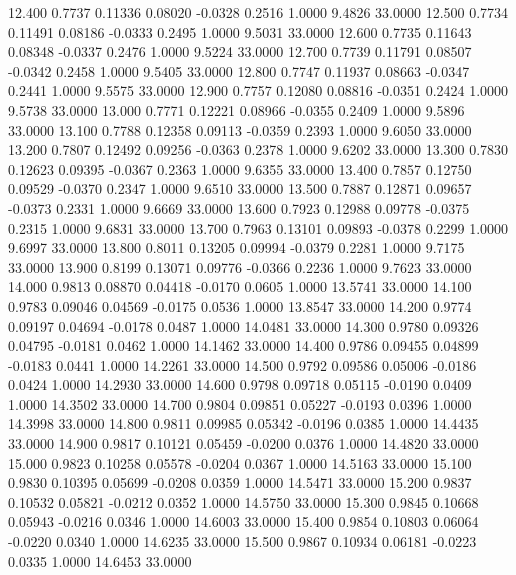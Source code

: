   12.400   0.7737   0.11336   0.08020  -0.0328   0.2516   1.0000   9.4826  33.0000
  12.500   0.7734   0.11491   0.08186  -0.0333   0.2495   1.0000   9.5031  33.0000
  12.600   0.7735   0.11643   0.08348  -0.0337   0.2476   1.0000   9.5224  33.0000
  12.700   0.7739   0.11791   0.08507  -0.0342   0.2458   1.0000   9.5405  33.0000
  12.800   0.7747   0.11937   0.08663  -0.0347   0.2441   1.0000   9.5575  33.0000
  12.900   0.7757   0.12080   0.08816  -0.0351   0.2424   1.0000   9.5738  33.0000
  13.000   0.7771   0.12221   0.08966  -0.0355   0.2409   1.0000   9.5896  33.0000
  13.100   0.7788   0.12358   0.09113  -0.0359   0.2393   1.0000   9.6050  33.0000
  13.200   0.7807   0.12492   0.09256  -0.0363   0.2378   1.0000   9.6202  33.0000
  13.300   0.7830   0.12623   0.09395  -0.0367   0.2363   1.0000   9.6355  33.0000
  13.400   0.7857   0.12750   0.09529  -0.0370   0.2347   1.0000   9.6510  33.0000
  13.500   0.7887   0.12871   0.09657  -0.0373   0.2331   1.0000   9.6669  33.0000
  13.600   0.7923   0.12988   0.09778  -0.0375   0.2315   1.0000   9.6831  33.0000
  13.700   0.7963   0.13101   0.09893  -0.0378   0.2299   1.0000   9.6997  33.0000
  13.800   0.8011   0.13205   0.09994  -0.0379   0.2281   1.0000   9.7175  33.0000
  13.900   0.8199   0.13071   0.09776  -0.0366   0.2236   1.0000   9.7623  33.0000
  14.000   0.9813   0.08870   0.04418  -0.0170   0.0605   1.0000  13.5741  33.0000
  14.100   0.9783   0.09046   0.04569  -0.0175   0.0536   1.0000  13.8547  33.0000
  14.200   0.9774   0.09197   0.04694  -0.0178   0.0487   1.0000  14.0481  33.0000
  14.300   0.9780   0.09326   0.04795  -0.0181   0.0462   1.0000  14.1462  33.0000
  14.400   0.9786   0.09455   0.04899  -0.0183   0.0441   1.0000  14.2261  33.0000
  14.500   0.9792   0.09586   0.05006  -0.0186   0.0424   1.0000  14.2930  33.0000
  14.600   0.9798   0.09718   0.05115  -0.0190   0.0409   1.0000  14.3502  33.0000
  14.700   0.9804   0.09851   0.05227  -0.0193   0.0396   1.0000  14.3998  33.0000
  14.800   0.9811   0.09985   0.05342  -0.0196   0.0385   1.0000  14.4435  33.0000
  14.900   0.9817   0.10121   0.05459  -0.0200   0.0376   1.0000  14.4820  33.0000
  15.000   0.9823   0.10258   0.05578  -0.0204   0.0367   1.0000  14.5163  33.0000
  15.100   0.9830   0.10395   0.05699  -0.0208   0.0359   1.0000  14.5471  33.0000
  15.200   0.9837   0.10532   0.05821  -0.0212   0.0352   1.0000  14.5750  33.0000
  15.300   0.9845   0.10668   0.05943  -0.0216   0.0346   1.0000  14.6003  33.0000
  15.400   0.9854   0.10803   0.06064  -0.0220   0.0340   1.0000  14.6235  33.0000
  15.500   0.9867   0.10934   0.06181  -0.0223   0.0335   1.0000  14.6453  33.0000
